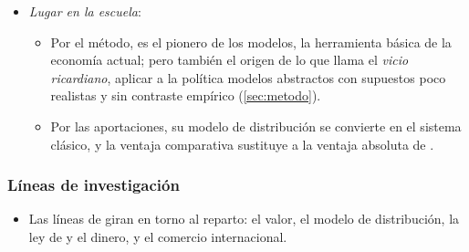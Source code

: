 \documentclass[11pt]{article}
\begin{document}
\begin{itemize}
\begin{itemize}
  \item Es el primero que razona con modelos: supuestos simples, deducción y conclusiones que se aplican a la política.
  \end{itemize}
\item \emph{Lugar en la escuela}:
  \begin{itemize}
  \item Por el método, es el pionero de los modelos, la herramienta básica de la economía actual; pero también el origen de lo que  llama el \emph{vicio ricardiano}, aplicar a la política modelos abstractos con supuestos poco realistas y sin contraste empírico (\ref{sec:metodo}).
  \item Por las aportaciones, su modelo de distribución se convierte en el sistema clásico, y la ventaja comparativa sustituye a la ventaja absoluta de .
  \end{itemize}
\end{itemize}

\subsubsection{Líneas de investigación}\label{sec:ricardo-lineas}

\begin{itemize}
\item Las líneas de  giran en torno al reparto: el valor, el modelo de distribución, la ley de  y el dinero, y el comercio internacional.
\end{itemize}
\end{document}
